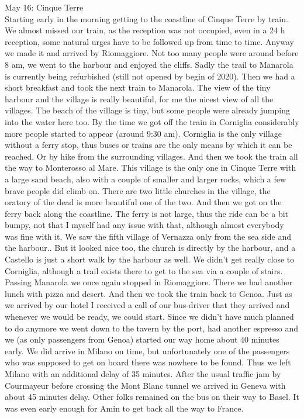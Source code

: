 May 16: Cinque Terre\\
Starting early in the morning getting to the coastline of Cinque Terre by train. We almost missed our train, as the reception was not occupied, even in a 24 h reception, some natural urges have to be followed up from time to time. Anyway we made it and arrived by Riomaggiore. Not too many people were around before 8 am, we went to the harbour and enjoyed the cliffs. Sadly the trail to Manarola is currently being refurbished (still not opened by begin of 2020). Then we had a short breakfast and took the next train to Manarola. The view of the tiny harbour and the village is really beautiful, for me the nicest view of all the villages. The beach of the village is tiny, but some people were already jumping into the water here too. By the time we got off the train in Corniglia considerably more people started to appear (around 9:30 am). Corniglia is the only village without a ferry stop, thus buses or trains are the only means by which it can be reached. Or by hike from the surrounding villages. And then we took the train all the way to Monterosso al Mare. This village is the only one in Cinque Terre with a large sand beach, also with a couple of smaller and larger rocks, which a few brave people did climb on. There are two little churches in the village, the oratory of the dead is more beautiful one of the two. And then we got on the ferry back along the coastline. The ferry is not large, thus the ride can be a bit bumpy, not that I myself had any issue with that, although almost everybody was fine with it. We saw the fifth village of Vernazza only from the sea side and the harbour.. But it looked nice too, the church is directly by the harbour, and a Castello is just a short walk by the harbour as well. We didn't get really close to Corniglia, although a trail exists there to get to the sea via a couple of stairs. Passing Manarola we once again stopped in Riomaggiore. There we had another lunch with pizza and desert. And then we took the train back to Genoa. Just as we arrived by our hotel I received a call of our bus-driver that they arrived and whenever we would be ready, we could start. Since we didn't have much planned to do anymore we went down to the tavern by the port, had another espresso and we (as only passengers from Genoa) started our way home about 40 minutes early. We did arrive in Milano on time, but unfortunately one of the passengers who was supposed to get on board there was nowhere to be found. Thus we left Milano with an additional delay of 35 minutes. After the usual traffic jam by Courmayeur before crossing the Mont Blanc tunnel we arrived in Geneva with about 45 minutes delay. Other folks remained on the bus on their way to Basel. It was even early enough for Amin to get back all the way to France.\\

